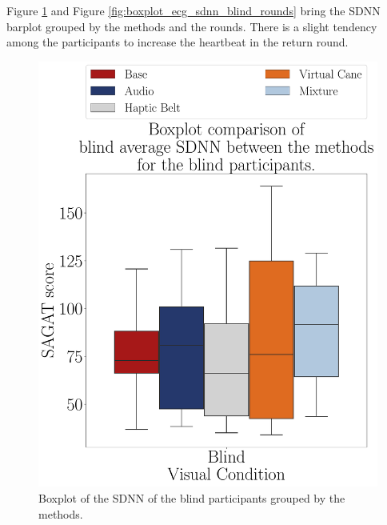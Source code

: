 %
%

Figure \ref{fig:boxplot_ecg_sdnn_blind_scene} and Figure \ref{fig:boxplot_ecg_sdnn_blind_rounds} bring the SDNN barplot grouped by the methods and the rounds. There is a slight tendency among the participants to increase the heartbeat in the return round.

\begin{figure}[!htb]
    \centering
    \begin{minipage}{0.45\textwidth}
        \centering
        \includegraphics[width = \textwidth]{Resultados/ECG/Figuras/pdf/boxplot_ecg_sdnn_blind_scene.pdf}
        \caption{Boxplot of the SDNN of the blind participants grouped by the methods.}
        \label{fig:boxplot_ecg_sdnn_blind_scene}
    \end{minipage}
    \begin{minipage}{0.075\textwidth}

\end{minipage}
\end{figure}
